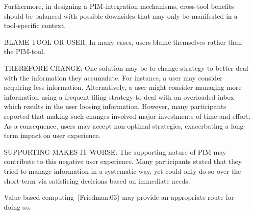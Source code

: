 Furthermore, in designing a PIM-integration mechanisms, cross-tool benefits should be balanced with possible downsides that may only be manifested in a tool-specific context. %

BLAME TOOL OR USER: In many cases, users blame themselves rather than the PIM-tool.

THEREFORE CHANGE: One solution may be to change strategy to better deal with the information they accumulate. For instance, a user may consider acquiring less information. Alternatively, a user might consider managing more information using a frequent-filing strategy to deal with an overloaded inbox which results in the user loosing information.  However, many participants reported that making such changes involved major investments of time and effort.  As a consequence, users may accept non-optimal strategies, exacerbating a long-term impact on user experience. %

SUPPORTING MAKES IT WORSE: The supporting nature of PIM may contribute to this negative user experience.   Many participants stated that they tried to manage information in a systematic way, yet could only do so over the short-term via satisficing decisions based on immediate needs.

Value-based computing~(Friedman:03) may provide an appropriate route for doing so.

